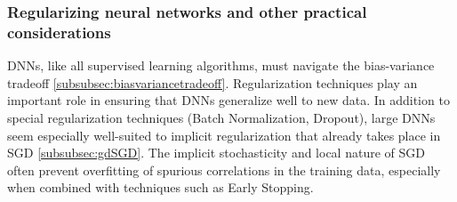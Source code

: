 \subsubsection{Regularizing neural networks and other practical considerations}
\label{subsubsec:dnnRegularizingPractical}
DNNs, like all supervised learning algorithms, must navigate the bias-variance tradeoff \ref{subsubsec:biasvariancetradeoff}.
Regularization techniques play an important role in ensuring that DNNs generalize well to new data. In addition to special regularization techniques (Batch Normalization, Dropout), large DNNs seem especially well-suited to implicit regularization that already takes place in SGD \ref{subsubsec:gdSGD}. The implicit stochasticity and local nature of SGD often prevent overfitting of spurious correlations in the training data, especially when combined with techniques such as Early Stopping.
